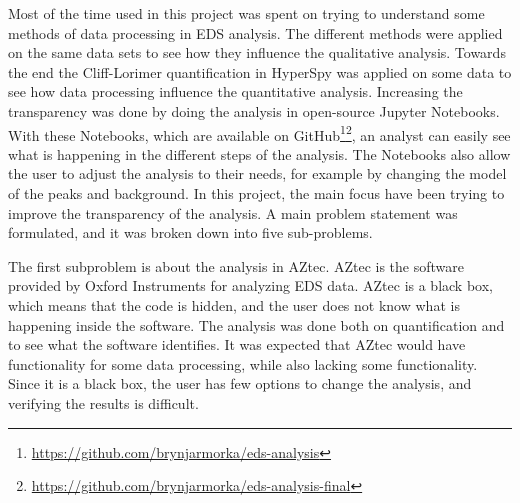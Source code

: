 Most of the time used in this project was spent on trying to understand some methods of data processing in EDS analysis.
The different methods were applied on the same data sets to see how they influence the qualitative analysis.
Towards the end the Cliff-Lorimer quantification in HyperSpy was applied on some data to see how data processing influence the quantitative analysis.
Increasing the transparency was done by doing the analysis in open-source Jupyter Notebooks.
With these Notebooks, which are available on GitHub\footnote{\url{https://github.com/brynjarmorka/eds-analysis}}\footnote{\url{https://github.com/brynjarmorka/eds-analysis-final}}, an analyst can easily see what is happening in the different steps of the analysis.
The Notebooks also allow the user to adjust the analysis to their needs, for example by changing the model of the peaks and background.
In this project, the main focus have been trying to improve the transparency of the analysis.
A main problem statement was formulated, and it was broken down into five sub-problems.


\begin{center}
    \vspace*{0.8cm}
    \vspace*{0.8cm}

\end{center}



The first subproblem is about the analysis in AZtec.
AZtec is the software provided by Oxford Instruments for analyzing EDS data.
AZtec is a black box, which means that the code is hidden, and the user does not know what is happening inside the software.
The analysis was done both on quantification and to see what the software identifies.
It was expected that AZtec would have functionality for some data processing, while also lacking some functionality.
Since it is a black box, the user has few options to change the analysis, and verifying the results is difficult.

